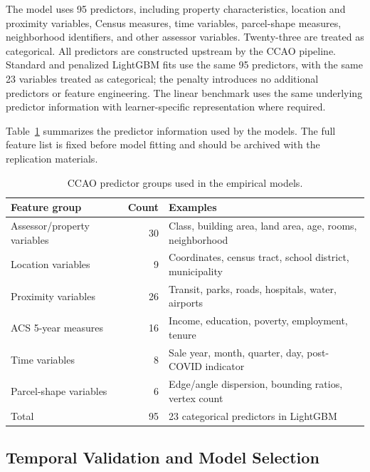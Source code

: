 \documentclass[10pt]{article}
\theoremstyle{definition}
\newcommand{\1}{\mathbf{1}}
\begin{document}
{{The model uses 95 predictors, including property characteristics, location and proximity variables, Census measures, time variables, parcel-shape measures, neighborhood identifiers, and other assessor variables. Twenty-three are treated as categorical.
{All predictors are constructed upstream by the CCAO pipeline. Standard and penalized LightGBM fits use the same 95 predictors, with the same 23 variables treated as categorical; the penalty introduces no additional predictors or feature engineering. The linear benchmark uses the same underlying predictor information with learner-specific representation where required.}

{Table~\ref{tab:feature_groups} summarizes the predictor information used by the models. The full feature list is fixed before model fitting and should be archived with the replication materials.}

{
\begin{table}[!ht]
\centering
\caption{CCAO predictor groups used in the empirical models.}
\label{tab:feature_groups}
\begin{tabular}{lrl}
\toprule
Feature group & Count & Examples \\
\midrule
Assessor/property variables & 30 & Class, building area, land area, age, rooms, neighborhood \\
Location variables & 9 & Coordinates, census tract, school district, municipality \\
Proximity variables & 26 & Transit, parks, roads, hospitals, water, airports \\
ACS 5-year measures & 16 & Income, education, poverty, employment, tenure \\
Time variables & 8 & Sale year, month, quarter, day, post-COVID indicator \\
Parcel-shape variables & 6 & Edge/angle dispersion, bounding ratios, vertex count \\
\midrule
Total & 95 & 23 categorical predictors in LightGBM \\
\bottomrule
\end{tabular}
\end{table}
}


\subsection{\textcolor{impGreen}{Temporal Validation and Model Selection}}
\label{subsec:selection}

}}
\end{document}
